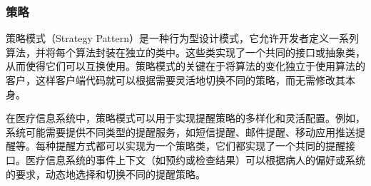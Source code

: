 \subsubsection{策略}

策略模式（Strategy Pattern）是一种行为型设计模式，它允许开发者定义一系列算法，并将每个算法封装在独立的类中。这些类实现了一个共同的接口或抽象类，从而使得它们可以互换使用。策略模式的关键在于将算法的变化独立于使用算法的客户，这样客户端代码就可以根据需要灵活地切换不同的策略，而无需修改其本身。

在医疗信息系统中，策略模式可以用于实现提醒策略的多样化和灵活配置。例如，系统可能需要提供不同类型的提醒服务，如短信提醒、邮件提醒、移动应用推送提醒等。每种提醒方式都可以实现为一个策略类，它们都实现了一个共同的提醒接口。医疗信息系统的事件上下文（如预约或检查结果）可以根据病人的偏好或系统的要求，动态地选择和切换不同的提醒策略。

